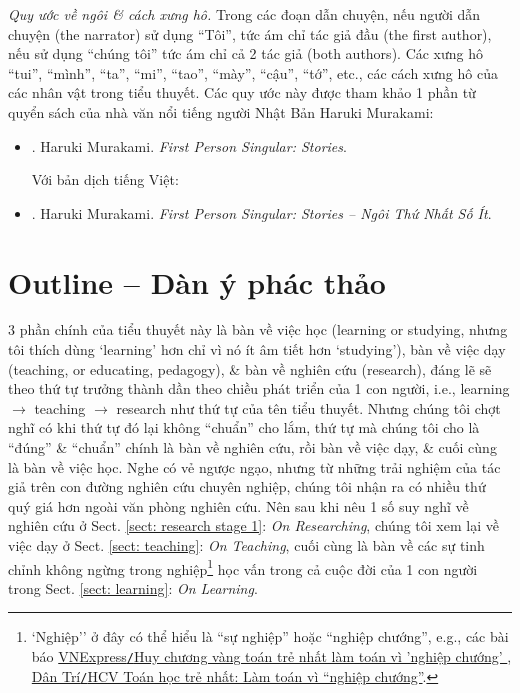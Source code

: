 \documentclass[12pt,oneside]{book}
\begin{document}
{\it Quy ước về ngôi \& cách xưng hô.} Trong các đoạn dẫn chuyện, nếu người dẫn chuyện (the narrator) sử dụng ``Tôi'', tức ám chỉ tác giả đầu (the first author), nếu sử dụng ``chúng tôi'' tức ám chỉ cả 2 tác giả (both authors). Các xưng hô ``tui'', ``mình'', ``ta'', ``mi'', ``tao'', ``mày'', ``cậu'', ``tớ'', etc., các cách xưng hô của các nhân vật trong tiểu thuyết. Các quy ước này được tham khảo 1 phần từ quyển sách của nhà văn nổi tiếng người Nhật Bản {\sc Haruki Murakami}:
\begin{itemize}
	\item \cite{Murakami_1st_person}. {\sc Haruki Murakami}. {\it First Person Singular: Stories}.
	
	Với bản dịch tiếng Việt:
	\item \cite{Murakami_ngoi_1}. {\sc Haruki Murakami}. {\it First Person Singular: Stories -- Ngôi Thứ Nhất Số Ít}.
\end{itemize}

\section{Outline -- Dàn ý phác thảo}
3 phần chính của tiểu thuyết này là bàn về việc học (learning or studying, nhưng tôi thích dùng `learning' hơn chỉ vì nó ít âm tiết hơn `studying'), bàn về việc dạy (teaching, or educating, pedagogy), \& bàn về nghiên cứu (research), đáng lẽ sẽ theo thứ tự trưởng thành dần theo chiều phát triển của 1 con người, i.e., learning $\to$ teaching $\to$ research như thứ tự của tên tiểu thuyết. Nhưng chúng tôi chợt nghĩ có khi thứ tự đó lại không ``chuẩn'' cho lắm, thứ tự mà chúng tôi cho là ``đúng'' \& ``chuẩn'' chính là bàn về nghiên cứu, rồi bàn về việc dạy, \& cuối cùng là bàn về việc học. Nghe có vẻ ngược ngạo, nhưng từ những trải nghiệm của tác giả trên con đường nghiên cứu chuyên nghiệp, chúng tôi nhận ra có nhiều thứ quý giá hơn ngoài văn phòng nghiên cứu. Nên sau khi nêu 1 số suy nghĩ về nghiên cứu ở Sect. \ref{sect: research stage 1}: {\it On Researching}, chúng tôi xem lại về việc dạy ở Sect. \ref{sect: teaching}: {\it On Teaching}, cuối cùng là bàn về các sự tinh chỉnh không ngừng trong nghiệp\footnote{`Nghiệp'' ở đây có thể hiểu là ``sự nghiệp'' hoặc ``nghiệp chướng'', e.g., các bài báo \href{https://vnexpress.net/huy-chuong-vang-toan-tre-nhat-lam-toan-vi-nghiep-chuong-2393718.html}{VNExpress{\tt/}Huy chương vàng toán trẻ nhất làm toán vì 'nghiệp chướng' }, \href{https://dantri.com.vn/giao-duc/hcv-toan-hoc-tre-nhat-lam-toan-vi-nghiep-chuong-1354447180.htm}{Dân Trí{\tt/}HCV Toán học trẻ nhất: Làm toán vì ``nghiệp chướng''}.} học vấn trong cả cuộc đời của 1 con người trong Sect. \ref{sect: learning}: {\it On Learning}.
\end{document}

